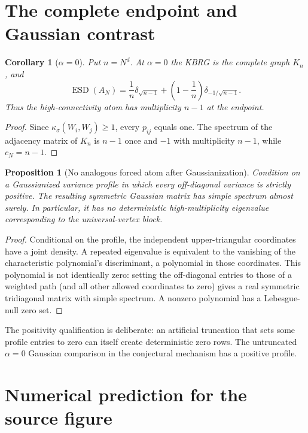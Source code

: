 \documentclass[11pt]{article}
\newtheorem{corollary}[theorem]{Corollary}
\newtheorem{proposition}[theorem]{Proposition}
\newcommand{\ESD}{\operatorname{ESD}}
\begin{document}
\section{The complete endpoint and Gaussian contrast}

\begin{corollary}[$\alpha=0$]
Put $n=N^d$.  At $\alpha=0$ the KBRG is the complete graph $K_n$, and
\[
 \ESD(A_N)=\frac1n\delta_{\sqrt{n-1}}
 +\left(1-\frac1n\right)\delta_{-1/\sqrt{n-1}}.
\]
Thus the high-connectivity atom has multiplicity $n-1$ at the endpoint.
\end{corollary}

\begin{proof}
Since $\kappa_\sigma(W_i,W_j)\geq1$, every $p_{ij}$ equals one.  The spectrum
of the adjacency matrix of $K_n$ is $n-1$ once and $-1$ with multiplicity
$n-1$, while $c_N=n-1$.
\end{proof}

\begin{proposition}[No analogous forced atom after Gaussianization]
Condition on a Gaussianized variance profile in which every off-diagonal
variance is strictly positive.  The resulting symmetric Gaussian matrix has
simple spectrum almost surely.  In particular, it has no deterministic
high-multiplicity eigenvalue corresponding to the universal-vertex block.
\end{proposition}

\begin{proof}
Conditional on the profile, the independent upper-triangular coordinates
have a joint density.  A repeated eigenvalue is equivalent to the vanishing
of the characteristic polynomial's discriminant, a polynomial in those
coordinates.  This polynomial is not identically zero: setting the
off-diagonal entries to those of a weighted path (and all other allowed
coordinates to zero) gives a real symmetric tridiagonal matrix with simple
spectrum.  A nonzero polynomial has a Lebesgue-null zero set.
\end{proof}

The positivity qualification is deliberate: an artificial truncation that
sets some profile entries to zero can itself create deterministic zero rows.
The untruncated $\alpha=0$ Gaussian comparison in the conjectural mechanism
has a positive profile.

\section{Numerical prediction for the source figure}
\end{document}

